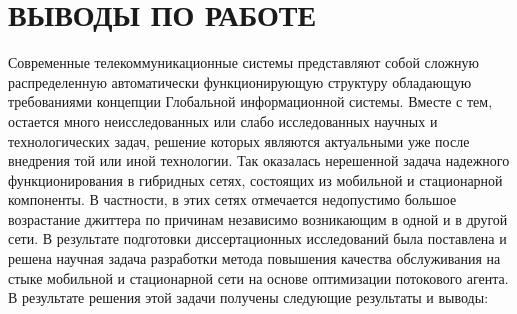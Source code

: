 \chapter*{ВЫВОДЫ ПО РАБОТЕ}
Современные телекоммуникационные системы представляют собой сложную распределенную автоматически функционирующую структуру обладающую требованиями концепции Глобальной информационной системы. 
Вместе с тем, остается много неисследованных или слабо исследованных научных и технологических задач, решение которых являются актуальными уже после внедрения той или иной технологии.
Так оказалась нерешенной задача надежного функционирования в гибридных сетях, состоящих из мобильной и стационарной компоненты. 
В частности, в этих сетях отмечается недопустимо большое возрастание джиттера по причинам независимо возникающим в одной и в другой сети.
В результате подготовки диссертационных исследований была поставлена и решена научная задача разработки метода повышения качества обслуживания 
на стыке мобильной и стационарной сети на основе оптимизации потокового агента. 
В результате решения этой задачи получены следующие результаты и выводы: 

